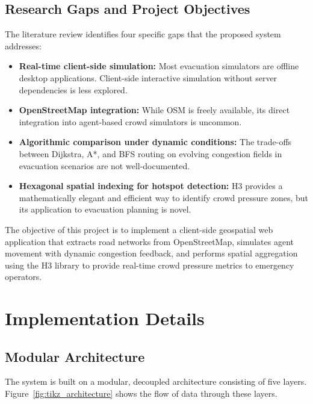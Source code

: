 \documentclass[12pt,a4paper,oneside]{report}
\begin{document}
\section{Research Gaps and Project Objectives}
The literature review identifies four specific gaps that the proposed system addresses:
\begin{itemize}
    \item \textbf{Real-time client-side simulation:} Most evacuation simulators are offline desktop applications. Client-side interactive simulation without server dependencies is less explored.
    \item \textbf{OpenStreetMap integration:} While OSM is freely available, its direct integration into agent-based crowd simulators is uncommon.
    \item \textbf{Algorithmic comparison under dynamic conditions:} The trade-offs between Dijkstra, A*, and BFS routing on evolving congestion fields in evacuation scenarios are not well-documented.
    \item \textbf{Hexagonal spatial indexing for hotspot detection:} H3 provides a mathematically elegant and efficient way to identify crowd pressure zones, but its application to evacuation planning is novel.
\end{itemize}

The objective of this project is to implement a client-side geospatial web application that extracts road networks from OpenStreetMap, simulates agent movement with dynamic congestion feedback, and performs spatial aggregation using the H3 library to provide real-time crowd pressure metrics to emergency operators.

\chapter{Implementation Details}

\section{Modular Architecture}
The system is built on a modular, decoupled architecture consisting of five layers. Figure~\ref{fig:tikz_architecture} shows the flow of data through these layers.
\end{document}
